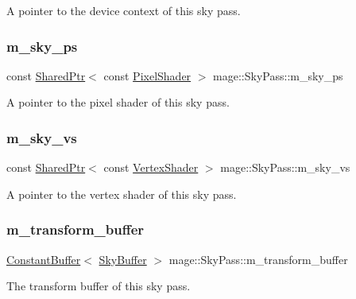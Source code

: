 A pointer to the device context of this sky pass. \hypertarget{classmage_1_1_sky_pass_abe9548ff1e4b3c15ac9004e4ba4ca052}{}\label{classmage_1_1_sky_pass_abe9548ff1e4b3c15ac9004e4ba4ca052} 
\subsubsection{\texorpdfstring{m\+\_\+sky\+\_\+ps}{m\_sky\_ps}}
{\footnotesize\ttfamily const \hyperlink{namespacemage_a1e01ae66713838a7a67d30e44c67703e}{Shared\+Ptr}$<$ const \hyperlink{namespacemage_a27ecaf266420ee7a494d64edc0757129}{Pixel\+Shader} $>$ mage\+::\+Sky\+Pass\+::m\+\_\+sky\+\_\+ps\hspace{0.3cm}{\ttfamily [private]}}

A pointer to the pixel shader of this sky pass. \hypertarget{classmage_1_1_sky_pass_a406ffced453d34b583a7bf975cf7f70f}{}\label{classmage_1_1_sky_pass_a406ffced453d34b583a7bf975cf7f70f} 
\subsubsection{\texorpdfstring{m\+\_\+sky\+\_\+vs}{m\_sky\_vs}}
{\footnotesize\ttfamily const \hyperlink{namespacemage_a1e01ae66713838a7a67d30e44c67703e}{Shared\+Ptr}$<$ const \hyperlink{classmage_1_1_vertex_shader}{Vertex\+Shader} $>$ mage\+::\+Sky\+Pass\+::m\+\_\+sky\+\_\+vs\hspace{0.3cm}{\ttfamily [private]}}

A pointer to the vertex shader of this sky pass. \hypertarget{classmage_1_1_sky_pass_afa5e9294b59414d37ea97b42cfadd041}{}\label{classmage_1_1_sky_pass_afa5e9294b59414d37ea97b42cfadd041} 
\subsubsection{\texorpdfstring{m\+\_\+transform\+\_\+buffer}{m\_transform\_buffer}}
{\footnotesize\ttfamily \hyperlink{structmage_1_1_constant_buffer}{Constant\+Buffer}$<$ \hyperlink{structmage_1_1_sky_buffer}{Sky\+Buffer} $>$ mage\+::\+Sky\+Pass\+::m\+\_\+transform\+\_\+buffer\hspace{0.3cm}{\ttfamily [private]}}

The transform buffer of this sky pass. 